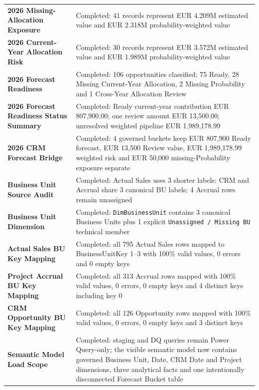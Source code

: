 \documentclass[11pt,a4paper]{article}
\begin{document}
\begin{summarybox}
\begin{tabularx}{\textwidth}{
    >{\bfseries\color{AaltoNavy}}p{4.3cm}
    X
}
2026 Missing-Allocation Exposure
&
Completed: 41 records represent EUR 4.209M estimated value and
EUR 2.318M probability-weighted value
\\

2026 Current-Year Allocation Risk
&
Completed: 30 records represent EUR 3.572M estimated value and
EUR 1.989M probability-weighted value
\\

2026 Forecast Readiness
&
Completed: 106 opportunities classified; 75 Ready, 28 Missing Current-Year
Allocation, 2 Missing Probability and 1 Cross-Year Allocation Review
\\

2026 Forecast Readiness Status Summary
&
Completed: Ready current-year contribution EUR 807,900.00; one review
amount EUR 13,500.00; unresolved weighted pipeline EUR 1,989,178.99
\\

2026 CRM Forecast Bridge
&
Completed: 4 governed buckets keep EUR 807,900 Ready forecast,
EUR 13,500 Review value, EUR 1,989,178.99 weighted risk and
EUR 50,000 missing-Probability exposure separate
\\

Business Unit Source Audit
&
Completed: Actual Sales uses 3 shorter labels; CRM and Accrual share
3 canonical BU labels; 4 Accrual rows remain unassigned
\\

Business Unit Dimension
&
Completed: \texttt{DimBusinessUnit} contains 3 canonical Business Units plus
1 explicit \texttt{Unassigned / Missing BU} technical member
\\

Actual Sales BU Key Mapping
&
Completed: all 795 Actual Sales rows mapped to BusinessUnitKey 1--3 with
100\% valid values, 0 errors and 0 empty keys
\\

Project Accrual BU Key Mapping
&
Completed: all 313 Accrual rows mapped with 100\% valid values,
0 errors, 0 empty keys and 4 distinct keys including key 0
\\

CRM Opportunity BU Key Mapping
&
Completed: all 126 Opportunity rows mapped with 100\% valid values,
0 errors, 0 empty keys and 3 distinct keys
\\

Semantic Model Load Scope
&
Completed: staging and DQ queries remain Power Query-only; the visible semantic
model now contains governed Business Unit, Date, CRM Date and Project dimensions,
three analytical facts and one intentionally disconnected Forecast Bucket table
\\


\end{tabularx}
\end{summarybox}
\end{document}
